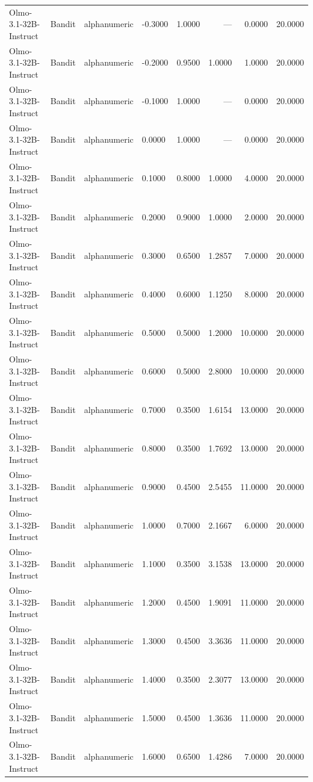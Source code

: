 \begin{table}
\begin{tabular}{llllrrrr}
Olmo-3.1-32B-Instruct & Bandit & alphanumeric & -0.3000 & 1.0000 & --- & 0.0000 & 20.0000 \\
Olmo-3.1-32B-Instruct & Bandit & alphanumeric & -0.2000 & 0.9500 & 1.0000 & 1.0000 & 20.0000 \\
Olmo-3.1-32B-Instruct & Bandit & alphanumeric & -0.1000 & 1.0000 & --- & 0.0000 & 20.0000 \\
Olmo-3.1-32B-Instruct & Bandit & alphanumeric & 0.0000 & 1.0000 & --- & 0.0000 & 20.0000 \\
Olmo-3.1-32B-Instruct & Bandit & alphanumeric & 0.1000 & 0.8000 & 1.0000 & 4.0000 & 20.0000 \\
Olmo-3.1-32B-Instruct & Bandit & alphanumeric & 0.2000 & 0.9000 & 1.0000 & 2.0000 & 20.0000 \\
Olmo-3.1-32B-Instruct & Bandit & alphanumeric & 0.3000 & 0.6500 & 1.2857 & 7.0000 & 20.0000 \\
Olmo-3.1-32B-Instruct & Bandit & alphanumeric & 0.4000 & 0.6000 & 1.1250 & 8.0000 & 20.0000 \\
Olmo-3.1-32B-Instruct & Bandit & alphanumeric & 0.5000 & 0.5000 & 1.2000 & 10.0000 & 20.0000 \\
Olmo-3.1-32B-Instruct & Bandit & alphanumeric & 0.6000 & 0.5000 & 2.8000 & 10.0000 & 20.0000 \\
Olmo-3.1-32B-Instruct & Bandit & alphanumeric & 0.7000 & 0.3500 & 1.6154 & 13.0000 & 20.0000 \\
Olmo-3.1-32B-Instruct & Bandit & alphanumeric & 0.8000 & 0.3500 & 1.7692 & 13.0000 & 20.0000 \\
Olmo-3.1-32B-Instruct & Bandit & alphanumeric & 0.9000 & 0.4500 & 2.5455 & 11.0000 & 20.0000 \\
Olmo-3.1-32B-Instruct & Bandit & alphanumeric & 1.0000 & 0.7000 & 2.1667 & 6.0000 & 20.0000 \\
Olmo-3.1-32B-Instruct & Bandit & alphanumeric & 1.1000 & 0.3500 & 3.1538 & 13.0000 & 20.0000 \\
Olmo-3.1-32B-Instruct & Bandit & alphanumeric & 1.2000 & 0.4500 & 1.9091 & 11.0000 & 20.0000 \\
Olmo-3.1-32B-Instruct & Bandit & alphanumeric & 1.3000 & 0.4500 & 3.3636 & 11.0000 & 20.0000 \\
Olmo-3.1-32B-Instruct & Bandit & alphanumeric & 1.4000 & 0.3500 & 2.3077 & 13.0000 & 20.0000 \\
Olmo-3.1-32B-Instruct & Bandit & alphanumeric & 1.5000 & 0.4500 & 1.3636 & 11.0000 & 20.0000 \\
Olmo-3.1-32B-Instruct & Bandit & alphanumeric & 1.6000 & 0.6500 & 1.4286 & 7.0000 & 20.0000 \\

\end{tabular}
\end{table}
